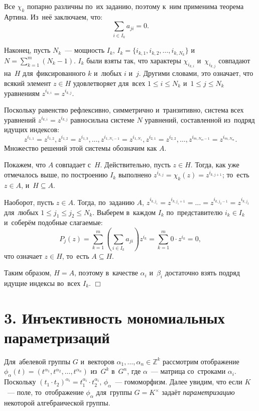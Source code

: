 \documentclass[twoside]{article}
\begin{document}
    Все $\chi_k$ попарно различны по~их заданию, поэтому к~ним применима теорема Артина. Из~неё заключаем, что:
    $$
    \sum_{i \in I_k} a_{ji} = 0.
    $$

    Наконец, пусть $N_k$~— мощность $I_k$, $I_k = \{i_{k, 1}, i_{k, 2}, \ldots, i_{k, N_k}\}$ и~$N = \sum_{k = 1}^m (N_k - 1)$.
    $I_k$ были взяты так, что характеры $\chi_{i_{k, i}}$ и~$\chi_{i_{k, j}}$ совпадают на~$H$ для~фиксированного $k$ и~любых $i$ и~$j$.
    Другими словами, это означает, что всякий элемент $z \in H$ удовлетворяет для~всех $1 \leq i \leq N_k$ и~$1 \leq j \leq N_k$
    уравнениям $z^{i_{k, i}} = z^{i_{k, j}}$.

    Поскольку равенство рефлексивно, симметрично и~транзитивно, система всех уравнений $z^{i_{k, i}} = z^{i_{k, j}}$ равносильна
    системе $N$ уравнений, составленной из~подряд идущих индексов:
    $$
        z^{i_{1, 1}} = z^{i_{1, 2}}, z^{i_{1, 2}} = z^{i_{1, 3}}, \ldots, z^{i_{1, N_1 - 1}} = z^{i_{1, N_1}}, z^{i_{2, 1}} = z^{i_{2, 2}}, \ldots, z^{i_{m, N_m - 1}} = z^{i_{m, N_m}}.
    $$
    Множество решений этой системы обозначим как $A$.

    Покажем, что $A$ совпадает с~$H$. Действительно, пусть $z \in H$. Тогда, как уже отмечалось выше,
    по построению $I_k$ выполнено $z^{i_{k, j}} = \chi_k(z) = z^{i_{k, j + 1}}$; то~есть $z \in A$, и~$H \subseteq A$.

    Наоборот, пусть $z \in A$. Тогда, по~заданию $A$, $z^{i_{k, j_1}} = z^{i_{k, j_1 + 1}} = \ldots = z^{i_{k, j_2 - 1}} = z^{i_{k, j_2}}$
    для~любых $1 \leq j_1 \leq j_2 \leq N_k$. Выберем в~каждом $I_k$ по~представителю $i_k \in I_k$ и~соберём подобные слагаемые:
    $$
        P_j(z) = \sum_{k = 1}^{m} \left( \sum_{i \in I_k} a_{ji} \right) z^{i_k} = \sum_{k = 1}^{m} 0 \cdot z^{i_k} = 0,
    $$
    что означает $z \in H$, то~есть $A \subseteq H$.

    Таким образом, $H = A$, поэтому в~качестве $\alpha_i$ и~$\beta_i$ достаточно взять подряд идущие индексы во~всех $I_k$.
\hfill$\Box$\medskip

\section*{3. Инъективность мономиальных параметризаций}

Для~абелевой группы $G$ и~векторов $\alpha_1, \ldots, \alpha_n \in \mathbb{Z}^k$ рассмотрим отображение $\phi_\alpha(t) = (t^{\alpha_1}, t^{\alpha_2}, \ldots, t^{\alpha_n})$
из~$G^k$ в~$G^n$, где $\alpha$~— матрица со~строками $\alpha_i$. Поскольку $(t_1 \cdot t_2)^{\alpha_i} = t_1^{\alpha_i} \cdot t_2^{\alpha_i}$,
$\phi_\alpha$~— гомоморфизм. Далее увидим, что если $K$~— поле, то~отображение $\phi_\alpha$ для~группы $G = K^\times$ задаёт \textit{параметризацию}
некоторой алгебраической группы.
\end{document}
